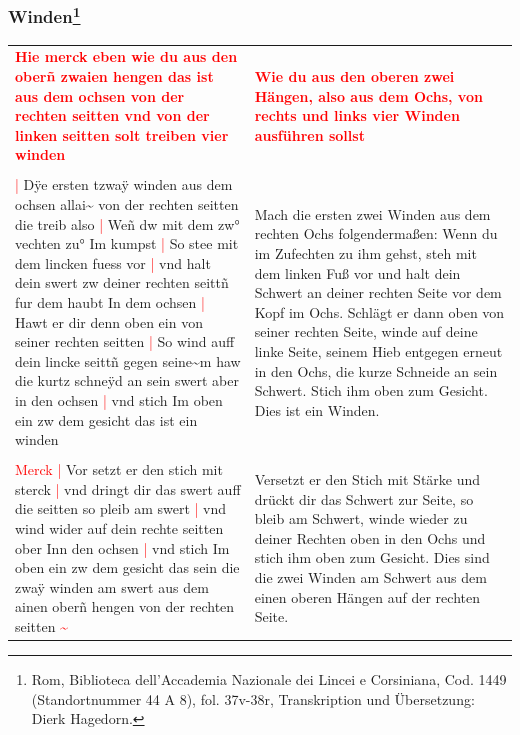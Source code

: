 \newpage

\null
\thispagestyle{empty}

\newpage

\subsubsection[Winden]{
    Winden\footnote{
        \hspace*{0.5ex}Rom, Biblioteca dell'Accademia Nazionale dei Lincei e Corsiniana,
        Cod. 1449 (Standortnummer 44 A 8), fol. 37v-38r, Transkription und Übersetzung: Dierk Hagedorn.}}

\begin{longtable}{p{6.25cm}p{6.25cm}}
    \textbf{\textcolor{red}{
        Hie merck eben wie du aus den oberñ zwaien hengen das ist aus dem ochsen von der rechten seitten vnd von der linken seitten solt treiben vier winden}}
    &
    \textbf{\textcolor{red}{
        Wie du aus den oberen zwei Hängen, also aus dem Ochs, von rechts und links vier Winden ausführen sollst}}
    \\
    \\
    \textcolor{red}{|} Dÿe ersten tzwaÿ winden aus dem ochsen allai\textasciitilde{} von der rechten seitten die treib also
    \textcolor{red}{|} Weñ dw mit dem zw° vechten zu° Im kumpst
    \textcolor{red}{|} So stee mit dem lincken fuess vor
    \textcolor{red}{|} vnd halt dein swert zw deiner rechten seittñ fur dem haubt In dem ochsen
    \textcolor{red}{|} Hawt er dir denn oben ein von seiner rechten seitten
    \textcolor{red}{|} So wind auff dein lincke seittñ gegen seine\textasciitilde{}m haw die kurtz schneÿd an sein swert aber in den ochsen
    \textcolor{red}{|} vnd stich Im oben ein zw dem gesicht das ist ein winden
    &
    Mach die ersten zwei Winden aus dem rechten Ochs folgendermaßen: Wenn du im Zufechten zu ihm gehst, steh mit dem linken Fuß vor und halt dein Schwert an deiner rechten Seite vor dem Kopf im Ochs.
    Schlägt er dann oben von seiner rechten Seite, winde auf deine linke Seite, seinem Hieb entgegen erneut in den Ochs, die kurze Schneide an sein Schwert.
    Stich ihm oben zum Gesicht.
    Dies ist ein Winden.
    \\
    \\
    \textcolor{red}{Merck}
    \textcolor{red}{|} Vor setzt er den stich mit sterck
    \textcolor{red}{|} vnd dringt dir das swert auff die seitten so pleib am swert
    \textcolor{red}{|} vnd wind wider auf dein rechte seitten ober Inn den ochsen
    \textcolor{red}{|} vnd stich Im oben ein zw dem gesicht das sein die zwaÿ winden am swert aus dem ainen oberñ hengen von der rechten seitten \textcolor{red}{\textasciitilde{}}
    &
    Versetzt er den Stich mit Stärke und drückt dir das Schwert zur Seite, so bleib am Schwert, winde wieder zu deiner Rechten oben in den Ochs und stich ihm oben zum Gesicht.
    Dies sind die zwei Winden am Schwert aus dem einen oberen Hängen auf der rechten Seite.
\end{longtable}

